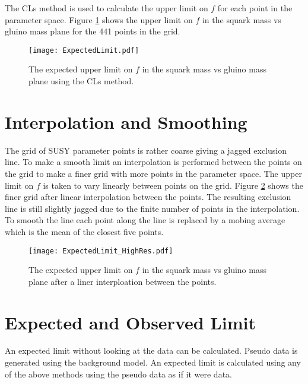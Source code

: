 The CLs method is used to calculate the upper limit on $f$ for each point in the
parameter space. Figure \ref{fig:limit} shows the upper limit on $f$ in the
squark mass vs gluino mass plane for the 441 points in the grid.

\begin{figure}
\begin{center}
\texttt{[image: ExpectedLimit.pdf]}
\end{center}
\caption{The expected upper limit on $f$ in the squark mass vs gluino mass plane 
using the CLs method. }
\label{fig:limit}
\end{figure}

\section{Interpolation and Smoothing}

The grid of SUSY parameter points is rather coarse giving a jagged exclusion
line. To make a smooth limit an interpolation is performed between the points 
on the grid to make a finer grid with more points in the parameter space. The 
upper limit on $f$ is taken to vary linearly between points on the grid. Figure
\ref{fig:interpolation} shows the finer grid after linear interpolation between
the points. The resulting exclusion line is still slightly jagged due to the
finite number of points in the interpolation. To smooth the line each point
along the line is replaced by a mobing average which is the mean of the closest 
five points.

\begin{figure}
\begin{center}
\texttt{[image: ExpectedLimit\_HighRes.pdf]}
\end{center}
\caption{The expected upper limit on $f$ in the squark mass vs gluino mass plane 
after a liner interploation between the points. }
\label{fig:interpolation}
\end{figure}

\section{Expected and Observed Limit}

An expected limit without looking at the data can be calculated. Pseudo data is
generated using the background model. An expected limit is calculated using any
of the above methods using the pseudo data as if it were data. \\

